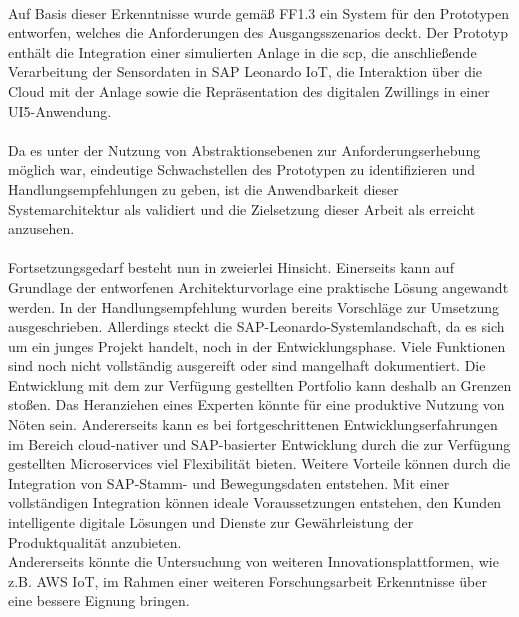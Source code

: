 \\ Auf Basis dieser Erkenntnisse wurde gemäß FF1.3 ein System für den Prototypen entworfen, welches die Anforderungen des Ausgangsszenarios deckt. Der Prototyp enthält die Integration einer simulierten Anlage in die \ac{scp}, die anschließende Verarbeitung der Sensordaten in SAP Leonardo IoT, die Interaktion über die Cloud mit der Anlage sowie die Repräsentation des digitalen Zwillings in einer UI5-Anwendung. 
\\\\%
Da es unter der Nutzung von Abstraktionsebenen zur Anforderungserhebung möglich war, eindeutige Schwachstellen des Prototypen zu identifizieren und Handlungsempfehlungen zu geben, ist die Anwendbarkeit dieser Systemarchitektur als validiert und die Zielsetzung dieser Arbeit als erreicht anzusehen. 
\\\\ Fortsetzungsgedarf besteht nun in zweierlei Hinsicht. Einerseits kann auf Grundlage der entworfenen Architekturvorlage eine praktische Lösung angewandt werden. In der Handlungsempfehlung wurden bereits Vorschläge zur Umsetzung ausgeschrieben. Allerdings steckt die SAP-Leonardo-Systemlandschaft, da es sich um ein junges Projekt handelt, noch in der Entwicklungsphase. Viele Funktionen sind noch nicht vollständig ausgereift oder sind mangelhaft dokumentiert. Die Entwicklung mit dem zur Verfügung gestellten Portfolio kann deshalb an Grenzen stoßen. Das Heranziehen eines Experten könnte für eine produktive Nutzung von Nöten sein. Andererseits kann es bei fortgeschrittenen Entwicklungserfahrungen im Bereich cloud-nativer und SAP-basierter Entwicklung durch die zur Verfügung gestellten Microservices viel Flexibilität bieten.  Weitere Vorteile können durch die  Integration von SAP-Stamm- und Bewegungsdaten entstehen. Mit einer vollständigen Integration können ideale Voraussetzungen entstehen, den Kunden intelligente digitale Lösungen und Dienste zur Gewährleistung der Produktqualität anzubieten. 
\\Andererseits könnte die Untersuchung von weiteren Innovationsplattformen, wie z.B. AWS IoT, im Rahmen einer weiteren Forschungsarbeit Erkenntnisse über eine bessere Eignung bringen. 
\newpage
